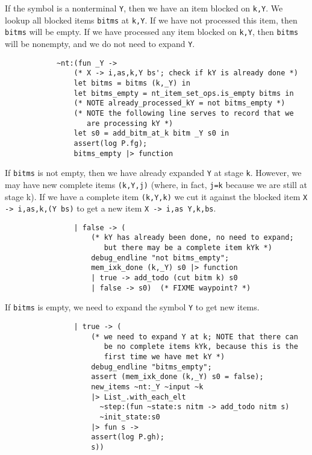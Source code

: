 \documentclass[]{article}
\begin{document}
\begin{multicols}{2}
If the symbol is a nonterminal \texttt{Y}, then we have an item blocked
on \texttt{k,Y}. We lookup all blocked items \texttt{bitms} at
\texttt{k,Y}. If we have not processed this item, then \texttt{bitms}
will be empty. If we have processed any item blocked on \texttt{k,Y},
then \texttt{bitms} will be nonempty, and we do not need to expand
\texttt{Y}.

\begin{verbatim}
            ~nt:(fun _Y -> 
                (* X -> i,as,k,Y bs'; check if kY is already done *)
                let bitms = bitms (k,_Y) in
                let bitms_empty = nt_item_set_ops.is_empty bitms in
                (* NOTE already_processed_kY = not bitms_empty *)
                (* NOTE the following line serves to record that we
                   are processing kY *)
                let s0 = add_bitm_at_k bitm _Y s0 in
                assert(log P.fg);
                bitms_empty |> function
\end{verbatim}

If \texttt{bitms} is not empty, then we have already expanded \texttt{Y}
at stage \texttt{k}. However, we may have new complete items
\texttt{(k,Y,j)} (where, in fact, \texttt{j=k} because we are still at
stage k). If we have a complete item \texttt{(k,Y,k)} we cut it against
the blocked item
\texttt{X -\textgreater{} i,as,k,(Y bs\textquotesingle{})} to get a new
item \texttt{X -\textgreater{} i,as Y,k,bs\textquotesingle{}}.

\begin{verbatim}
                | false -> (
                    (* kY has already been done, no need to expand;
                       but there may be a complete item kYk *)
                    debug_endline "not bitms_empty";
                    mem_ixk_done (k,_Y) s0 |> function
                    | true -> add_todo (cut bitm k) s0
                    | false -> s0)  (* FIXME waypoint? *)
\end{verbatim}

If \texttt{bitms} is empty, we need to expand the symbol \texttt{Y} to
get new items.

\begin{verbatim}
                | true -> (
                    (* we need to expand Y at k; NOTE that there can
                       be no complete items kYk, because this is the
                       first time we have met kY *)
                    debug_endline "bitms_empty";
                    assert (mem_ixk_done (k,_Y) s0 = false);
                    new_items ~nt:_Y ~input ~k 
                    |> List_.with_each_elt 
                      ~step:(fun ~state:s nitm -> add_todo nitm s) 
                      ~init_state:s0
                    |> fun s -> 
                    assert(log P.gh);
                    s))
\end{verbatim}


\end{multicols}
\end{document}
